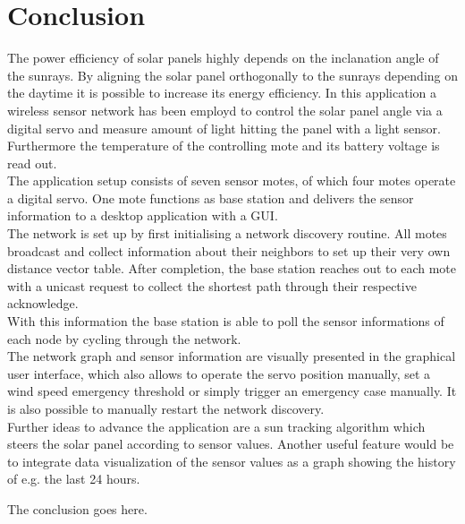 \documentclass[conference]{IEEEtran}
\begin{document}
\section{Conclusion}
The power efficiency of solar panels highly depends on the inclanation angle of the sunrays. By aligning the solar panel orthogonally to the sunrays depending on the daytime it is possible to increase its energy efficiency. In this application a wireless sensor network has been employd to control the solar panel angle via a digital servo and measure amount of light hitting the panel with a light sensor. Furthermore the temperature of the controlling mote and its battery voltage is read out.\\
The application setup consists of seven sensor motes, of which four motes operate a digital servo. One mote functions as base station and delivers the sensor information to a desktop application with a GUI.\\
The network is set up by first initialising a network discovery routine. All motes broadcast and collect information about their neighbors to set up their very own distance vector table. After completion, the base station reaches out to each mote with a unicast request to collect the shortest path through their respective acknowledge.\\
With this information the base station is able to poll the sensor informations of each node by cycling through the network.\\
The network graph and sensor information are visually presented in the graphical user interface, which also allows to operate the servo position manually, set a wind speed emergency threshold or simply trigger an emergency case manually. It is also possible to manually restart the network discovery.\\
Further ideas to advance the application are a sun tracking algorithm which steers the solar panel according to sensor values. Another useful feature would be to integrate data visualization of the sensor values as a graph showing the history of e.g. the last 24 hours.

The conclusion goes here.\cite{dunkels2011contikimac}




\end{document}
